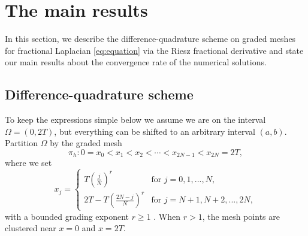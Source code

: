 \documentclass{amsart}
\theoremstyle{definition}
\theoremstyle{remark}
\numberwithin{equation}{section}
\begin{document}
	
	









\section{The main results}


In this section, we describe  the difference-quadrature scheme   on graded meshes  for fractional Laplacian \eqref{eq:equation}
via the  Riesz fractional derivative
and state our main results about the convergence rate of the numerical solutions.


\subsection{Difference-quadrature scheme}
\label{sec:numformat}

To keep the expressions simple below we assume we are on the interval $\Omega = (0, 2T)$, but everything can be shifted to an arbitrary interval $(a, b)$.
Partition $\Omega$ by the graded mesh
\begin{equation*}
    \pi_h : 0 = x_0 < x_1 < x_2 < \cdots < x_{2N-1} < x_{2N} = 2T ,
\end{equation*}
where we set
\begin{equation} \label{def:xj}
  x_j = \begin{cases}
    T \left(\frac{j}{N}\right)^r      & \text{for  } j=0, 1, ... , N,  \\
    2T - T \left(\frac{2N-j}{N}\right)^r  & \text{for  } j= N+1, N+2, ..., 2N,
  \end{cases}
\end{equation}
with a bounded grading exponent $r\ge 1$ .
When $r > 1$, the mesh points are clustered near $x = 0$ and $x = 2T$.
\end{document}
